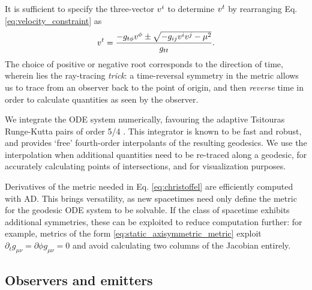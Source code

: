 It is sufficient to specify the three-vector $v^{i}$ to determine $v^{t}$ by rearranging Eq. \eqref{eq:velocity_constraint} as
\begin{equation}
v^{t}  = \frac{-g_{t\phi} v^{\phi} \pm
    \sqrt{-g_{ij} v^{i} v^{j} - \mu^2}
}{g_{tt}}.
\end{equation}
The choice of positive or negative root corresponds to the direction of time, wherein lies the ray-tracing \textit{trick}: a time-reversal symmetry in the metric allows us to trace from an observer back to the point of origin, and then \textit{reverse} time in order to calculate quantities as seen by the observer. 

We integrate the ODE system numerically, favouring the adaptive Tsitouras Runge-Kutta pairs of order 5/4 \citep{tsitouras_rungekutta_2011}. This integrator is known to be fast and robust, and provides `free' fourth-order interpolants of the resulting geodesics. We use the interpolation when additional quantities need to be re-traced along a geodesic, for accurately calculating points of intersections, and for visualization purposes.

Derivatives of the metric needed in Eq. \eqref{eq:christoffel} are efficiently computed with AD. This brings versatility, as new spacetimes need only define the metric for the geodesic ODE system to be solvable. If the class of spacetime exhibits additional symmetries, these can be exploited to reduce computation further: for example, metrics of the form \eqref{eq:static_axisymmetric_metric} exploit $\partial_t g_{\mu\nu} = \partial{\phi} g_{\mu\nu} = 0$ and avoid calculating two columns of the Jacobian entirely.

\subsection{Observers and emitters}

